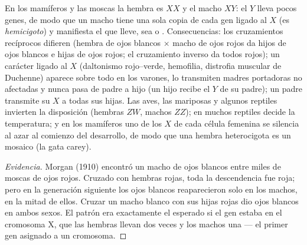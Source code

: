 \begin{proposition}\label{prop:b2:meiosis-heredity:sexlinked}
En los mamíferos y las moscas la hembra es $XX$ y el macho $XY$: el $Y$
lleva pocos genes, de modo que un macho tiene una sola copia de cada gen
ligado al $X$ (es \emph{hemicigoto}) y manifiesta el  que lleve,
sea  o . Consecuencias: los cruzamientos recíprocos
difieren (hembra de ojos blancos $\times$ macho de ojos rojos da hijos de
ojos blancos e
hijas de ojos rojos; el cruzamiento inverso da todos rojos); un carácter
 ligado al
$X$ (daltonismo rojo--verde, hemofilia, distrofia muscular de
Duchenne) aparece sobre todo en los varones, lo transmiten madres
portadoras no afectadas y nunca pasa de padre a hijo (un hijo recibe el
$Y$ de su padre); un padre transmite su $X$ a todas sus hijas.
Las aves, las mariposas y algunos reptiles invierten la disposición
(hembras $ZW$, machos $ZZ$); en muchos reptiles decide la temperatura; y
en los mamíferos uno de los $X$ de cada célula femenina se silencia al
azar al comienzo del desarrollo, de modo que una hembra heterocigota es
un mosaico (la gata carey).
\end{proposition}
\begin{proof}[Evidencia]
Morgan (1910) encontró un macho de ojos blancos entre miles de moscas de
ojos rojos. Cruzado con hembras rojas, toda la descendencia fue roja;
pero en la generación siguiente los ojos blancos reaparecieron solo en
los machos, en la mitad de ellos. Cruzar un macho blanco con sus hijas
rojas dio ojos blancos en ambos sexos. El patrón era exactamente el
esperado si el gen estaba en el cromosoma X, que las hembras llevan dos
veces y los machos una --- el primer gen asignado a un cromosoma.
\end{proof}

